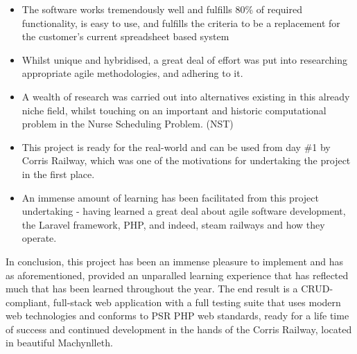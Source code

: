 \begin{itemize}
    \item The software works tremendously well and fulfills 80\% of required functionality, is easy to use, and fulfills the criteria to be a replacement for the customer's current spreadsheet based system
    \item Whilst unique and hybridised, a great deal of effort was put into researching appropriate agile methodologies, and adhering to it.
    \item A wealth of research was carried out into alternatives existing in this already niche field, whilst touching on an important and historic computational problem in the Nurse Scheduling Problem. (NST)
    \item This project is ready for the real-world and can be used from day \#1 by Corris Railway, which was one of the motivations for undertaking the project in the first place.
    \item An immense amount of learning has been facilitated from this project undertaking - having learned a great deal about agile software development, the Laravel framework, PHP, and indeed, steam railways and how they operate.
\end{itemize}

In conclusion, this project has been an immense pleasure to implement and has as aforementioned, provided an unparalled learning experience that has reflected much that has been learned throughout the year. The end result is a CRUD-compliant, full-stack web application with a full testing suite that uses modern web technologies and conforms to PSR PHP web standards, ready for a life time of success and continued development in the hands of the Corris Railway, located in beautiful Machynlleth.